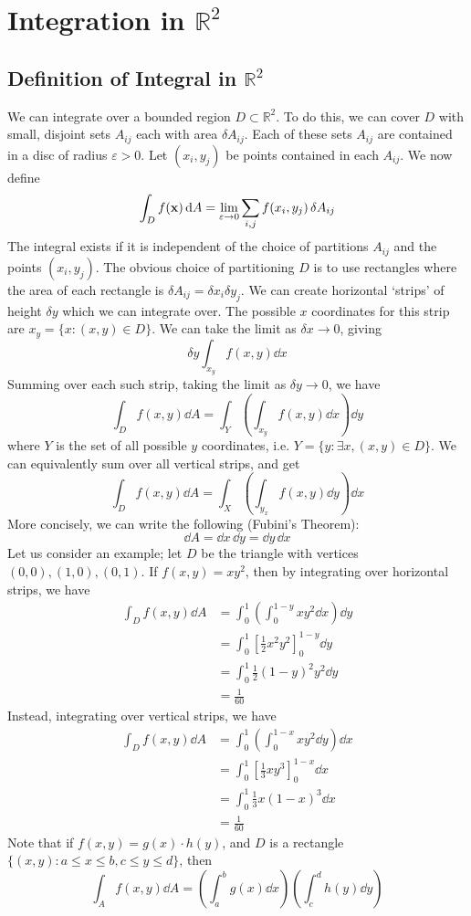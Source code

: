 \documentclass{article}
\begin{document}
\section{Integration in $\mathbb R^2$}
\subsection{Definition of Integral in $\mathbb R^2$}
We can integrate over a bounded region $D \subset \mathbb R^2$. To do this, we can cover $D$ with small, disjoint sets $A_{ij}$ each with area $\delta A_{ij}$. Each of these sets $A_{ij}$ are contained in a disc of radius $\varepsilon > 0$. Let $(x_i, y_j)$ be points contained in each $A_{ij}$. We now define
\[ \int_D f(\vb x) \dd{A} = \lim_{\varepsilon \to 0} \sum_{i, j} f(x_i, y_j) \,\delta A_{ij} \]
The integral exists if it is independent of the choice of partitions $A_{ij}$ and the points $(x_i, y_j)$. The obvious choice of partitioning $D$ is to use rectangles where the area of each rectangle is $\delta A_{ij} = \delta x_i \delta y_j$. We can create horizontal `strips' of height $\delta y$ which we can integrate over. The possible $x$ coordinates for this strip are $x_y = \{ x \colon (x, y) \in D \}$. We can take the limit as $\delta x \to 0$, giving
\[ \delta y \int_{x_y} f(x, y) \dd{x} \]
Summing over each such strip, taking the limit as $\delta y \to 0$, we have
\[ \int_D f(x, y) \dd{A} = \int_Y \left( \int_{x_y} f(x, y) \dd{x} \right) \dd{y} \]
where $Y$ is the set of all possible $y$ coordinates, i.e. $Y = \{ y \colon \exists x, (x, y) \in D \}$. We can equivalently sum over all vertical strips, and get
\[ \int_D f(x, y) \dd{A} = \int_X \left( \int_{y_x} f(x, y) \dd{y} \right) \dd{x} \]
More concisely, we can write the following (Fubini's Theorem):
\[ \dd{A} = \dd{x} \, \dd{y} = \dd{y} \, \dd{x} \]
Let us consider an example; let $D$ be the triangle with vertices $(0, 0), (1, 0), (0, 1)$. If $f(x, y) = xy^2$, then by integrating over horizontal strips, we have
\begin{align*}
	\int_D f(x, y) \dd{A} & = \int_0^1 \left( \int_0^{1-y} xy^2 \dd{x} \right) \dd{y}  \\
	                      & = \int_0^1 \left[ \frac{1}{2}x^2y^2 \right]_0^{1-y} \dd{y} \\
	                      & = \int_0^1 \frac{1}{2}(1-y)^2y^2 \dd{y}                    \\
	                      & = \frac{1}{60}
\end{align*}
Instead, integrating over vertical strips, we have
\begin{align*}
	\int_D f(x, y) \dd{A} & = \int_0^1 \left( \int_0^{1-x} xy^2 \dd{y} \right) \dd{x} \\
	                      & = \int_0^1 \left[ \frac{1}{3} xy^3 \right]_0^{1-x} \dd{x} \\
	                      & = \int_0^1 \frac{1}{3} x(1-x)^3 \dd{x}                    \\
	                      & = \frac{1}{60}
\end{align*}
Note that if $f(x, y) = g(x) \cdot h(y)$, and $D$ is a rectangle $\{ (x, y) \colon a \leq x \leq b, c \leq y \leq d \}$, then
\[ \int_A f(x, y) \dd{A} = \left( \int_a^b g(x) \dd{x} \right)\left( \int_c^d h(y) \dd{y} \right) \]
\end{document}
